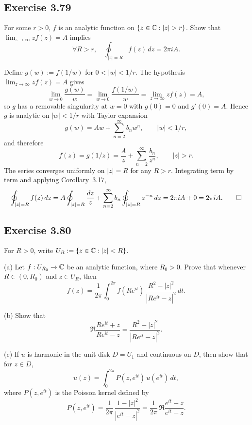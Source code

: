 \documentclass{article}
\begin{document}
\subsection{Exercise 3.79}

For some $r > 0$, $f$ is an analytic function on
$\{z \in \mathbb{C} : |z| > r\}$.
Show that $\lim_{z\to\infty} z f(z) = A$ implies
\[
  \forall R > r,\quad \oint_{|z|=R} f(z)\,dz = 2\pi i A.
\]

\begin{solution}
  Define $g(w) := f(1/w)$ for $0 < |w| < 1/r$.
  The hypothesis $\lim_{z\to\infty}zf(z) = A$ gives
  \[
    \lim_{w\to 0}\frac{g(w)}{w}
    = \lim_{w\to 0}\frac{f(1/w)}{w}
    = \lim_{z\to\infty}zf(z) = A,
  \]
  so $g$ has a removable singularity at $w=0$ with
  $g(0)=0$ and $g'(0)=A$.
  Hence $g$ is analytic on $|w|<1/r$ with Taylor expansion
  \[
    g(w) = Aw + \sum_{n=2}^{\infty}b_n w^n,\qquad |w|<1/r,
  \]
  and therefore
  \[
    f(z) = g(1/z) = \frac{A}{z}
    + \sum_{n=2}^{\infty}\frac{b_n}{z^n},
    \qquad |z|>r.
  \]
  The series converges uniformly on $|z|=R$ for any $R>r$.
  Integrating term by term and applying Corollary~3.17,
  \[
    \oint_{|z|=R}f(z)\,dz
    = A\oint_{|z|=R}\frac{dz}{z}
    + \sum_{n=2}^{\infty}b_n\oint_{|z|=R}z^{-n}\,dz
    = 2\pi iA + 0 = 2\pi iA.\qedhere
  \]
\end{solution}

\subsection{Exercise 3.80}
\label{sec:ca-ex-3-80}

For $R > 0$, write $U_R := \{z \in \mathbb{C} : |z| < R\}$.

(a) Let $f : U_{R_0} \to \mathbb{C}$ be an analytic function, where
$R_0 > 0$. Prove that whenever $R \in (0, R_0)$ and $z \in U_R$,
then
\[
  f(z) = \frac{1}{2\pi}\int_0^{2\pi}
  f(Re^{it})\,\frac{R^2 - |z|^2}{|Re^{it} - z|^2}\,dt.
\]

(b) Show that
\[
  \Re\frac{Re^{it} + z}{Re^{it} - z}
  = \frac{R^2 - |z|^2}{|Re^{it} - z|^2}.
\]

(c) If $u$ is harmonic in the unit disk $D = U_1$ and continuous
on $\bar{D}$, then show that for $z \in D$,
\[
  u(z) = \int_0^{2\pi} P(z, e^{it})\,u(e^{it})\,dt,
\]
where $P(z, e^{it})$ is the Poisson kernel defined by
\[
  P(z, e^{it})
  = \frac{1}{2\pi}\,\frac{1 - |z|^2}{|e^{it} - z|^2}
  = \frac{1}{2\pi}\,\Re\frac{e^{it} + z}{e^{it} - z}.
\]
\end{document}
